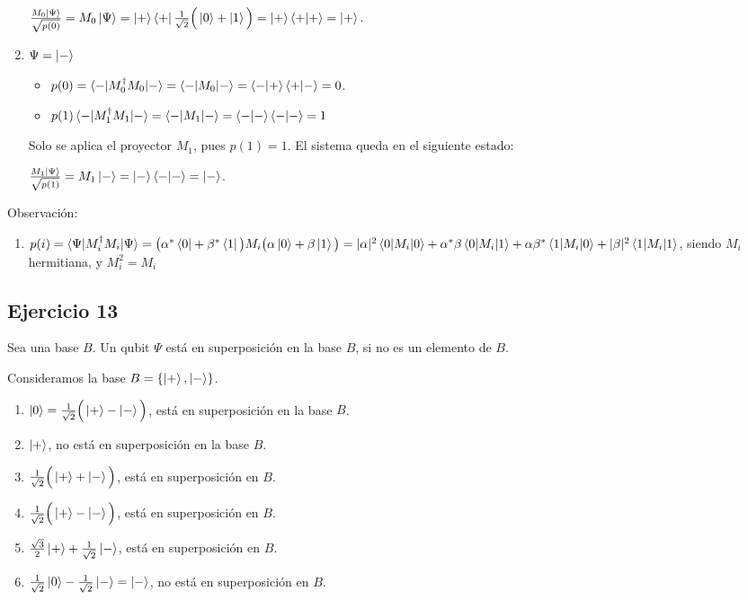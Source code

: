 \documentclass[a4paper,11pt]{article}
\begin{document}
\begin{enumerate}[label=\alph*)]
  $\frac{M_0 \left\vert{\Psi}\right\rangle}{\sqrt{p(0)}} = M_0 \left\vert{\Psi}\right\rangle = \left\vert{+}\right\rangle\left\langle{+}\right\vert \frac{1}{\sqrt{2}}\Big(\left\vert{0}\right\rangle + \left\vert{1}\right\rangle\Big) = 
  \left\vert{+}\right\rangle\braket{+ | +} = \left\vert{+}\right\rangle.$

\item $\Psi = \left\vert{-}\right\rangle$

  \begin{itemize}
  \item $p(0) = \braket{- | M_0^{\dag} M_0 | -} = \braket{- | M_0 | -} =
    \braket{- | +}\braket{+ | -} = 0$. 
  \item $p(1) \braket{- | M_1^{\dag} M_1 | -} = \braket{- | M_1 | -} =
    \braket{- | -}\braket{- | -} = 1$
  \end{itemize}

  Solo se aplica el proyector $M_1$, pues $p(1) = 1$. El sistema queda en el siguiente estado:
  
  $\frac{M_1 \left\vert{\Psi}\right\rangle}{\sqrt{p(1)}} = M_1 \left\vert{-}\right\rangle = \left\vert{-}\right\rangle \braket{-|-} = \left\vert{-}\right\rangle$.
  
\end{enumerate}

Observación:

\begin{enumerate}[label=(\arabic*)]
\item $p(i) = \braket{\Psi | M_i^{\dag}M_i | \Psi} = \big(\alpha^*\left\langle{0}\right\vert + \beta^*\left\langle{1}\right\vert\big) M_i \big(\alpha\left\vert{0}\right\rangle + \beta\left\vert{1}\right\rangle\big) =
  |\alpha|^2\braket{0|M_i|0} + \alpha^*\beta\braket{0|M_i|1} + \alpha\beta^*\braket{1|M_i|0} + |\beta|^2\braket{1|M_i|1}$,
  siendo $M_i$ hermitiana, y $M_i^2 = M_i$
\end{enumerate}

\subsection*{Ejercicio 13}

Sea una base $B$. Un qubit $\Psi$ está en superposición en la base $B$, si no es un elemento de $B$.

Consideramos la base $B = \{ \left\vert{+}\right\rangle, \left\vert{-}\right\rangle\}$.

\begin{enumerate}[label=\alph*)]
\item $\left\vert{0}\right\rangle = \frac{1}{\sqrt{2}}\Big( \left\vert{+}\right\rangle - \left\vert{-}\right\rangle\Big)$, está en superposición en la base $B$.
\item $\left\vert{+}\right\rangle$, no está en superposición en la base $B$.
\item $\frac{1}{\sqrt{2}}\Big( \left\vert{+}\right\rangle + \left\vert{-}\right\rangle \Big)$, está en superposición en $B$.
\item $\frac{1}{\sqrt{2}}\Big( \left\vert{+}\right\rangle - \left\vert{-}\right\rangle \Big)$, está en superposición en $B$.
\item $\frac{\sqrt{3}}{2}\left\vert{+}\right\rangle + \frac{1}{\sqrt{2}}\left\vert{-}\right\rangle$, está en superposición en $B$.
\item $\frac{1}{\sqrt{2}}\left\vert{0}\right\rangle - \frac{1}{\sqrt{2}}\left\vert{-}\right\rangle = \left\vert{-}\right\rangle$, no está en superposición en $B$.
\end{enumerate}
\end{document}

